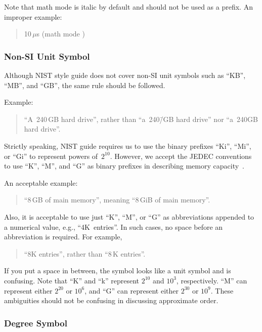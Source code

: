 Note that math mode \qco{\\mu} is italic by default and should not
be used as a prefix.
An improper example:
\begin{quote}
  10\,$\mu $s (math mode \qco{\\mu})
\end{quote}

\subsubsection{Non-SI Unit Symbol}
\label{sec:app:styleguide:Non-SI Unit Symbol}

Although NIST style guide does not cover non-SI unit symbols
such as ``KB'', ``MB'', and ``GB'', the same rule should be followed.

Example:

\begin{quote}
  ``A~240\,GB hard drive'', rather than ``a~240\=/GB hard drive''
  nor ``a~240GB hard drive''.
\end{quote}

Strictly speaking, NIST guide requires us to use the binary prefixes
``Ki'', ``Mi'', or ``Gi'' to represent powers of~$2^{10}$.
However, we accept the JEDEC conventions to use ``K'', ``M'',
and ``G'' as binary prefixes in describing memory
capacity~\cite{JEDEC:dict:prefixmega}.

An acceptable example:
\begin{quote}
  ``8\,GB of main memory'', meaning ``8\,GiB of main memory''.
\end{quote}

Also, it is acceptable to use just ``K'', ``M'', or ``G'' as abbreviations
appended to a numerical value, e.g., ``4K~entries''.
In such cases, no space before an abbreviation is required.
For example,

\begin{quote}
  ``8K entries'', rather than ``8\,K entries''.
\end{quote}

If you put a space in between, the symbol looks like a unit symbol and
is confusing.
Note that ``K'' and ``k'' represent $2^{10}$ and $10^3$, respectively.
``M'' can represent either $2^{20}$ or $10^6$, and ``G'' can represent
either $2^{30}$ or $10^9$.
These ambiguities should not be confusing in discussing approximate order.

\subsubsection{Degree Symbol}
\label{sec:app:styleguide:Degree Symbol}

